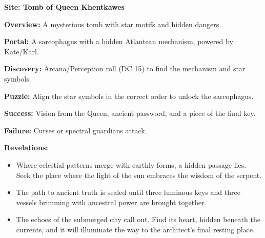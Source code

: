\documentclass[12pt]{article}
\begin{document}
\textbf{Site: Tomb of Queen Khentkawes}

\textbf{Overview:}  
A mysterious tomb with star motifs and hidden dangers.

\textbf{Portal:}  
A sarcophagus with a hidden Atlantean mechanism, powered by Kate/Karl.

\textbf{Discovery:}  
Arcana/Perception roll (DC 15) to find the mechanism and star symbols.

\textbf{Puzzle:}  
Align the star symbols in the correct order to unlock the sarcophagus.

\textbf{Success:}  
Vision from the Queen, ancient password, and a piece of the final key.

\textbf{Failure:}  
Curses or spectral guardians attack.

\textbf{Revelations:}
\begin{itemize}
  \item Where celestial patterns merge with earthly forms, a hidden passage lies. Seek the place where the light of the sun embraces the wisdom of the serpent.
  \item The path to ancient truth is sealed until three luminous keys and three vessels brimming with ancestral power are brought together.
  \item The echoes of the submerged city call out. Find its heart, hidden beneath the currents, and it will illuminate the way to the architect's final resting place.
\end{itemize}
\end{document}
